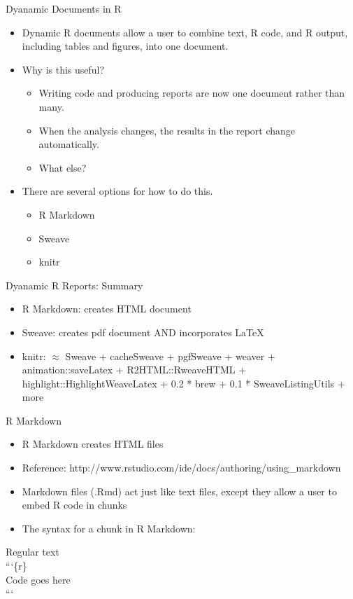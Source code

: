 \documentclass[table]{beamer}\usepackage[]{graphicx}\usepackage[]{color}
\begin{document}
\begin{frame}{Dyanamic Documents in R}
\begin{itemize}
\item Dynamic R documents allow a user to combine text, R code, and R output, including tables and figures, into one document.
\item Why is this useful? 
\begin{itemize}
\item Writing code and producing reports are now one document rather than many.
\item When the analysis changes, the results in the report change automatically.  
\item What else?
\end{itemize}
\item There are several options for how to do this.  
\begin{itemize}
\item R Markdown
\item Sweave
\item knitr
\end{itemize}
\end{itemize}
\end{frame}


\begin{frame}{Dyanamic R Reports: Summary}
\begin{itemize}
\item R Markdown: creates HTML document
\item Sweave: creates pdf document AND incorporates LaTeX
\item knitr: $\approx$ Sweave + cacheSweave + pgfSweave + weaver + animation::saveLatex + R2HTML::RweaveHTML + highlight::HighlightWeaveLatex + 0.2 * brew + 0.1 * SweaveListingUtils + more
\end{itemize}
\end{frame}

\begin{frame}{R Markdown}
\begin{itemize}
\item R Markdown creates HTML files  
\item Reference: http://www.rstudio.com/ide/docs/authoring/using\_markdown
\item Markdown files (.Rmd) act just like text files, except they allow a user to embed R code in chunks
\item The syntax for a chunk in R Markdown:
\end{itemize}
Regular text \\
```\{r\}\\
Code goes here\\
```\\
\end{frame}
\end{document}
